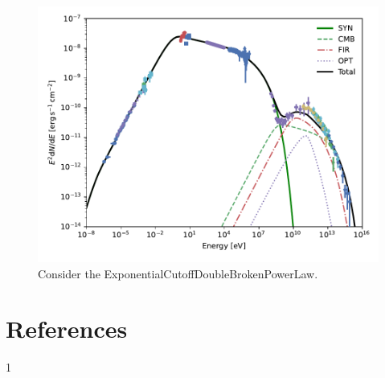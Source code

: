 \documentclass[9pt, mathserif]{beamer}
\begin{document}
        \begin{frame}
            \begin{figure}[t]
                \centering
                \includegraphics[width=0.8\linewidth]{SynIC-BestFitPar3.pdf}
                \caption{Consider the ExponentialCutoffDoubleBrokenPowerLaw.}
            \end{figure}
        \end{frame}





    \section{References}
        \begin{frame}
            \begin{thebibliography}{1}
                1
            \end{thebibliography}
        \end{frame}
\end{document}
